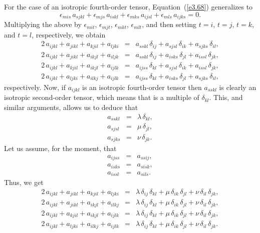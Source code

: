 For the case of an isotropic fourth-order tensor, Equation~(\ref{e3.68}) generalizes to
\begin{equation}
\epsilon_{mis}\,a_{sjkl} + \epsilon_{mjs}\,a_{iskl}+\epsilon_{mks}\,a_{ijsl} +\epsilon_{mls}\,a_{ijks}=0.
\end{equation}
Multiplying the above by $\epsilon_{mit}$,  $\epsilon_{mjt}$, $\epsilon_{mkt}$, $\epsilon_{mlt}$, and then
setting $t=i$, $t=j$, $t=k$, and $t=l$, respectively, we obtain
\begin{eqnarray}
2\,a_{ijkl} + a_{jikl} + a_{kjil}+a_{ljki} &=&a_{sskl}\,\delta_{ij} + a_{sjsl}\,\delta_{ik}+ a_{sjks}\,\delta_{il},\\[0.5ex]
2\,a_{ijkl} + a_{jikl} + a_{ikjl} +a_{iljk}&=& a_{sskl}\,\delta_{ij} +a_{isks}\,\delta_{jl}+ a_{issl}\,\delta_{jk},\\[0.5ex]
2\,a_{ijkl} +a_{kjil} +a_{ikjl}+a_{ijlk} &=&a_{ijss}\,\delta_{kl}+a_{sjsl}\,\delta_{ik} + a_{issl}\,\delta_{jk},\\[0.5ex]
2\,a_{ijkl}+a_{ljki} +a_{ilkj}+a_{ijlk} &=&a_{ijss}\,\delta_{kl}+a_{isks}\,\delta_{jl}+a_{sjks}\,\delta_{il},
\end{eqnarray}
respectively.
Now, if $a_{ijkl}$ is an isotropic fourth-order tensor then $a_{sskl}$ is clearly an isotropic second-order tensor, which means that is a multiple of $\delta_{kl}$. This, and similar arguments, allows us to deduce that
\begin{eqnarray}
a_{sskl} &=&\lambda\,\delta_{kl},\\[0.5ex]
a_{sjsl} &=&\mu\,\delta_{jl},\\[0.5ex]
a_{sjks} &=& \nu\,\delta_{jk}.
\end{eqnarray}
Let us assume, for the moment, that
\begin{eqnarray}
a_{ijss} &=&a_{ssij},\label{e3.91}\\[0.5ex]
a_{isks} &=&a_{sisk},\\[0.5ex]
a_{issl} &=& a_{sils}.\label{e3.91x}
\end{eqnarray}
Thus, we get 
\begin{eqnarray}\label{e3.92a}
2\,a_{ijkl} + a_{jikl} +a_{kjil} +a_{ljki} &=&\lambda\,\delta_{ij}\,\delta_{kl} + \mu\,\delta_{ik}\,\delta_{jl} 
+\nu\,\delta_{il}\,\delta_{jk},\\[0.5ex]
2\,a_{ijkl} + a_{jikl} +a_{ikjl} +a_{ilkj}&=&\lambda\,\delta_{ij}\,\delta_{kl} + \mu\,\delta_{ik}\,\delta_{jl} 
+\nu\,\delta_{il}\,\delta_{jk},\\[0.5ex]
2\,a_{ijkl} +a_{kjil} +a_{ikjl} +a_{ijlk} &=&\lambda\,\delta_{ij}\,\delta_{kl} + \mu\,\delta_{ik}\,\delta_{jl} 
+\nu\,\delta_{il}\,\delta_{jk},\\[0.5ex]
2\,a_{ijkl} +a_{ljki} +a_{ilkj} +a_{ijlk} &=&\lambda\,\delta_{ij}\,\delta_{kl} + \mu\,\delta_{ik}\,\delta_{jl} 
+\nu\,\delta_{il}\,\delta_{jk}.\label{e3.92}
\end{eqnarray}
